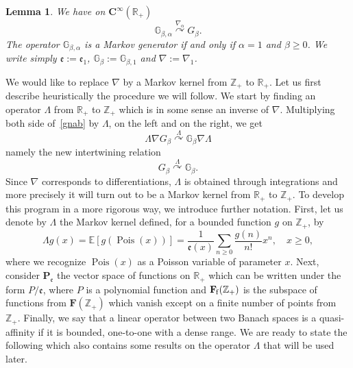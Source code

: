 \documentclass[10pt]{amsart}
\newtheorem{lemm}[theo]{Lemma}\newtheorem{prop}[theo]{Proposition}\newtheorem{coro}[theo]{Corollary}\newtheorem{conj}[theo]{Conjecture}
\theoremstyle{definition}\newtheorem{defi}[theo]{Definition}\newtheorem{rema}[theo]{Remark}\newtheorem{exam}[theo]{Example}\newtheorem{exem}[theo]{Example}\newtheorem{nota}[theo]{Notation}
\DeclareMathOperator{\Pois}{Pois}
\newcommand{\df}{\mathrel{:=}}
\newcommand{\cC}{{\mathbf C}}
\newcommand{\EE}{\mathbb{E}}
\newcommand{\RR}{\mathbb{R}}
\newcommand{\ZZ}{\mathbb{Z}}
\newcommand{\fe}{\mathfrak{e}}
\newcommand{\iy}{\infty}
\newcommand{\na}{\nabla}
\newcommand{\dBg}{{\discret{G}}}
\newcommand{\Bg}{G}
\newcommand{\esP}{\mathbf{P}}
\newcommand{\esF}{\mathbf{F}}
\newcommand{\esPe}{\esP_{\! \fe}}
\newcommand{\esFf}{\esF_{\hskip-.3mm\mathrm{f}}}
\newcommand{\discret}[1]{\mathds{#1}}
\newcommand{\Gate}[3]{#1\stackrel{#2}{\curvearrowright}#3}
\begin{document}
\begin{lemm} \label{lem:gate_gen_B}
We have on $\cC^\iy(\RR_+)$
\begin{equation}\label{gnab}
\Gate{\dBg_{\beta,\alpha}}{\na_{\alpha}}{\Bg_{\beta}}.
\end{equation}
The operator $\dBg_{\beta,\alpha}$ is a Markov generator if and only if $\alpha=1$ and $\beta \geq 0$. We write simply $\fe\df\fe_1$, $\dBg_{\beta}\df\dBg_{\beta,1}$ and $\na\df\na_{1}$.
\end{lemm} We would like to replace $\na$ by a Markov kernel from $\ZZ_+$ to $\RR_+$. Let us first describe heuristically the procedure we will follow. We start by finding an operator $\Lambda$ from $\RR_+$ to $\ZZ_+$ which is in some sense an inverse of $\na$. Multiplying both side of~\eqref{gnab} by $\Lambda$, on the left and on the right, we get
\begin{equation}\label{b2}
\Gate{\Lambda\na
\Bg_{\beta}}{\Lambda}{\dBg_{\beta}\na\Lambda}
\end{equation}
namely the new intertwining relation
\begin{equation}\label{b3}
\Gate{\Bg_{\beta}}{\Lambda}{\dBg_{\beta}}.
\end{equation}
Since $\na$
corresponds to differentiations, $\Lambda$ is obtained through integrations and more precisely it will turn out to be a Markov kernel from $\RR_+$ to $\ZZ_+$. To develop this program in a more rigorous way, we introduce further notation. First, let us denote by $\Lambda$ the Markov kernel defined, for a bounded function $g$ on $\ZZ_+$, by
\begin{equation}\label{Lambda}
\Lambda g(x)=\EE[g(\Pois(x))]=\frac{1}{\fe(x)}\sum_{n\geq 0} \frac{g(n)}{n!} x^n, \quad x\geq 0,
\end{equation}
where we recognize $\Pois(x)$ as a Poisson variable of parameter $x$. Next, consider $\esPe$ the vector space of functions on $\RR_+$ which can be written under the form $P/\fe$, where $P$ is a polynomial function and $\esFf(\ZZ_+)$ is the subspace of functions from $\esF(\ZZ_+)$ which vanish except on a finite number of points from $\ZZ_+$. Finally, we say that a linear operator between two Banach spaces is a quasi-affinity if it is bounded, one-to-one with a dense range. We are ready to state the following which also contains some results on the operator $\Lambda$ that will be used later.
\end{document}
